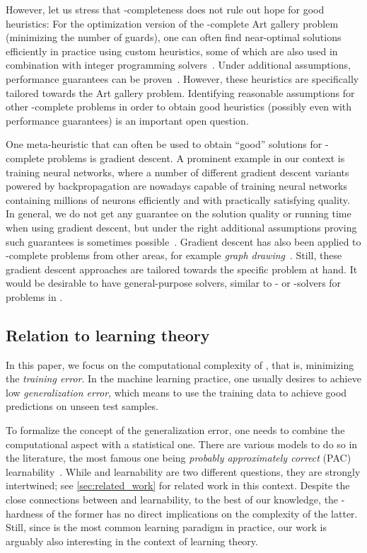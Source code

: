 \documentclass{toc}
\begin{document}
However, let us stress that \ER-completeness does not rule out hope for good heuristics:
%
%
%
%
%
%
%
%
%
%
For the optimization version of the \ER-complete Art gallery problem (minimizing the number
of guards),  %
one can often find near-optimal solutions efficiently in practice
using custom heuristics, some of which are also used in combination with integer programming
solvers~\cite{Rezende2016_ArtGalleries}.
Under additional assumptions, performance guarantees can be proven~\cite{Hengeveld2021_ArtGallery}.
However, these heuristics are specifically tailored towards the Art gallery problem.
Identifying reasonable assumptions for other \ER-complete problems in order to obtain
good heuristics (possibly even with performance guarantees) is an important open question.

One meta-heuristic that can %
often be used   %
%
to obtain  %
\enquote{good} solutions for \ER-complete
problems is gradient descent.  
A prominent example in our context is training neural networks, where
%
a number of  %
different gradient descent variants powered by backpropagation are nowadays capable 
of training neural networks containing millions of neurons
%
efficiently and with practically satisfying quality.
%
%
%
%
%
%
%
%
In general, we do not get any guarantee on the solution quality or running time
%
when using gradient descent, but under the right additional assumptions proving such guarantees is sometimes possible~\cite{Brutzkus2017_OptimalGD}.
Gradient descent has also been applied to \ER-complete problems from other areas, for example \emph{graph drawing}~\cite{Ahmed2022_GraphDrawingGD}.
Still, these gradient descent approaches are tailored towards the specific problem at hand.
It would be %
%
desirable to have 
%
general-purpose   %
solvers, similar to \SAT- or \MIP-solvers for problems in \NP.

\subsection{Relation to learning theory}
In this paper, we %
focus on the computational complexity of \ERM, that is, minimizing the \emph{training error}.
In the machine learning practice, one usually desires to achieve low \emph{generalization error}, which means to use the training data to achieve good predictions on unseen test samples.

To formalize the concept of the generalization error, one needs to combine the computational
aspect with a statistical one.
There are various models to do so in the literature, the most famous one being 
\emph{probably approximately correct} (PAC) learnability~\cite{Shalev2014_UnderstandingML,Valiant1984_Theory}.
%
%
%
%
While \ERM and learnability are two different questions, they are strongly intertwined; see \cref{sec:related_work} for related work in this context.
Despite the close connections between \ERM and learnability, to the best of our knowledge, the \ER-hardness of the former has no direct implications on the complexity of the latter.
Still, since \ERM is the most common learning paradigm in practice, our work is arguably also interesting in the context of learning theory.
\end{document}
